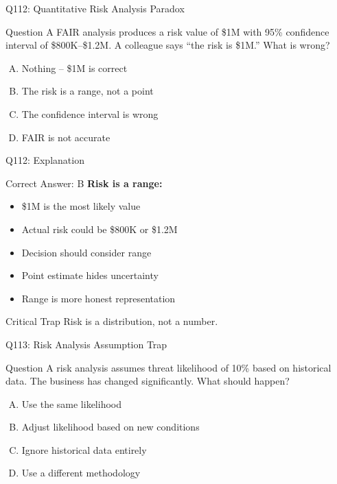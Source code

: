 \documentclass{beamer}
\begin{document}
	\begin{frame}{Q112: Quantitative Risk Analysis Paradox}
		\begin{block}{Question}
			A FAIR analysis produces a risk value of \$1M with 95\% confidence interval of \$800K--\$1.2M. A colleague says ``the risk is \$1M.'' What is wrong?
		\end{block}
		\begin{enumerate}[(A)]
			\item Nothing -- \$1M is correct
			\item The risk is a range, not a point
			\item The confidence interval is wrong
			\item FAIR is not accurate
		\end{enumerate}
	\end{frame}
	
	\begin{frame}{Q112: Explanation}
		\begin{block}{Correct Answer: B}
			\textbf{Risk is a range:}
			\begin{itemize}
				\item \$1M is the most likely value
				\item Actual risk could be \$800K or \$1.2M
				\item Decision should consider range
				\item Point estimate hides uncertainty
				\item Range is more honest representation
			\end{itemize}
		\end{block}
		\begin{alertblock}{Critical Trap}
			Risk is a distribution, not a number.
		\end{alertblock}
	\end{frame}
	
	\begin{frame}{Q113: Risk Analysis Assumption Trap}
		\begin{block}{Question}
			A risk analysis assumes threat likelihood of 10\% based on historical data. The business has changed significantly. What should happen?
		\end{block}
		\begin{enumerate}[(A)]
			\item Use the same likelihood
			\item Adjust likelihood based on new conditions
			\item Ignore historical data entirely
			\item Use a different methodology
		\end{enumerate}
	\end{frame}
	
\end{document}
